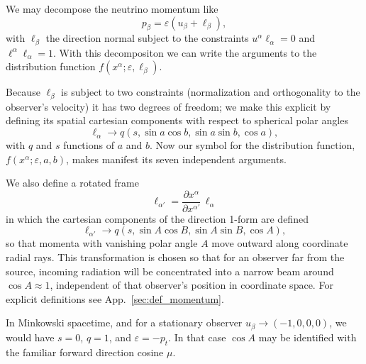 \documentclass[aps,floatfix,prd,superscriptaddress,twocolumn]{revtex4-1}
\newcommand{\todo}[1]{\marginpar{\tiny{\textcolor{red}{#1}}}}
\begin{document}
We may decompose the neutrino momentum like
\begin{equation}
  \label{eqn:def_momentum}
  p_\beta = \varepsilon (u_\beta + \ell_\beta),
\end{equation}
with $\ell_\beta$ the direction normal subject to the constraints
$u^\alpha \ell_\alpha = 0$ and $\ell^\alpha \ell_\alpha=1$.
With this decompositon we can write the arguments to the distribution function
$f(x^\alpha;\varepsilon,\ell_\beta)$.

Because $\ell_\beta$ is subject to two constraints
(normalization and orthogonality to the observer's velocity)
it has two degrees of freedom; we make this explicit by defining its
spatial cartesian components with respect to spherical polar angles
\begin{equation}
  \label{eqn:def_direction}
  \ell_\alpha \rightarrow
  q (s,\sin a \cos b,\sin a\sin b,\cos a),
\end{equation}
with $q$ and $s$ functions of $a$ and $b$.
Now our symbol for the distribution function,
$f(x^\alpha;\varepsilon,a,b)$,
makes manifest its seven independent arguments.

We also define a rotated frame
\begin{equation}
  \ell_{\alpha'}=\frac{\partial x^\alpha}{\partial x^{\alpha'}}\,\ell_\alpha \nonumber
\end{equation}
in which the cartesian components of the direction 1-form are defined
\begin{equation}
  \label{eqn:def_direction_primed}
  \ell_{\alpha'} \rightarrow
  q (s,\sin A \cos B,\sin A\sin B,\cos A),
\end{equation}
so that momenta with vanishing polar angle $A$ move outward along coordinate
radial rays.
This transformation is chosen so that for an observer far from the source,
incoming radiation will be concentrated into a narrow beam around $\cos A\approx1$,
independent of that observer's position in coordinate space.
For explicit definitions see App.~\ref{sec:def_momentum}.

In Minkowski spacetime, and for a stationary observer
$u_\beta\rightarrow(-1,0,0,0)$, we would have $s=0$, $q=1$,
and $\varepsilon=-p_t$. In that case $\cos A$ may be identified
\todo{cite someone that uses $\mu$}
with the familiar forward direction cosine $\mu$.
\end{document}
